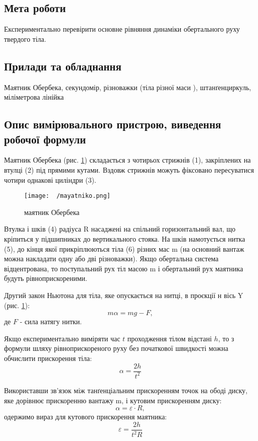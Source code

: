 \documentclass[12pt]{article}
\begin{document}

{\fontsize{14}{16.2}\selectfont

\subsection*{Мета роботи}
Експериментально перевірити основне рівняння динаміки обертального руху твердого тіла.

\subsection*{Прилади та обладнання}
Маятник Обербека, секундомір,  різноважки (тіла різної маси ), штанґенциркуль, міліметрова лінійка

\subsection*{Опис вимірювального пристрою, виведення
робочої формули}

Маятник Обербека (рис. \ref{mayatnik}) складається з чотирьох стрижнів (1), закріплених на втулці (2) під прямими кутами. Вздовж стрижнів можуть фіксовано пересуватися чотири однакові циліндри (3).

\begin{figure}[h]
	\centering
	\texttt{[image: ~/mayatniko.png]}
	\caption{маятник Обербека\label{mayatnik}}
\end{figure}

Втулка і шків (4) радіуса  R  насаджені на спільний горизонтальний вал, що кріпиться у підшипниках до вертикального стояка. На шків намотується нитка (5), до кінця якої прикріплюються тіла (6) різних мас m (на основний вантаж можна накладати одну або дві різноважки).   Якщо обертальна система відцентрована, то поступальний рух тіл масою m і обертальний рух маятника будуть рівноприскореними.

\medskip

Другий закон Ньютона для тіла, яке опускається на нитці,
в проєкції н вісь Y (рис. \ref{mayatnik}):
$$m\alpha=mg-F,$$
де $F$ - сила натягу нитки.

Якщо експериментально виміряти час $t$  проходження тілом відстані $h$,
то з формули шляху рівноприскореного руху без початкової швидкості
можна обчислити  прискорення тіла:
$$\alpha = \frac{2h}{t^2}$$

Використавши зв’язок між танґенціальним прискоренням точок на ободі диску,
яке дорівнює прискоренню вантажу m, і кутовим прискоренням диску:
$$\alpha = \varepsilon \cdot R,$$
одержимо вираз для кутового прискорення маятника:
$$\varepsilon = \frac{2h}{t^2 R}$$

}
\end{document}

